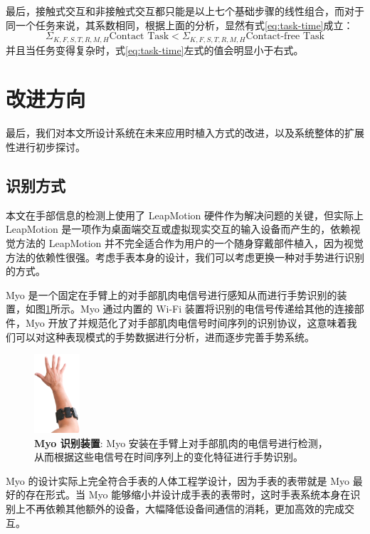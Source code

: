 最后，接触式交互和非接触式交互都只能是以上七个基础步骤的线性组合，而对于同一个任务来说，其系数相同，根据上面的分析，显然有式\ref{eq:task-time}成立：
\begin{equation}
    \label{eq:task-time}
    \Sigma_{K,F,S,T,R,M,H}{\text{Contact Task}} < \Sigma_{K,F,S,T,R,M,H}{\text{Contact-free Task}}
\end{equation}
并且当任务变得复杂时，式\ref{eq:task-time}左式的值会明显小于右式。

\section{改进方向}

最后，我们对本文所设计系统在未来应用时植入方式的改进，以及系统整体的扩展性进行初步探讨。

\subsection{识别方式}

本文在手部信息的检测上使用了 LeapMotion 硬件作为解决问题的关键，但实际上 LeapMotion 是一项作为桌面端交互或虚拟现实交互的输入设备而产生的，依赖视觉方法的 LeapMotion 并不完全适合作为用户的一个随身穿戴部件植入，因为视觉方法的依赖性很强。考虑手表本身的设计，我们可以考虑更换一种对手势进行识别的方式。

Myo \cite{Myo:2016} 是一个固定在手臂上的对手部肌肉电信号进行感知从而进行手势识别的装置，如图\ref{fig:myo}所示。Myo 通过内置的 Wi-Fi 装置将识别的电信号传递给其他的连接部件，Myo 开放了并规范化了对手部肌肉电信号时间序列的识别协议，这意味着我们可以对这种表现模式的手势数据进行分析，进而逐步完善手势系统。

\begin{figure}[H]
    \centering
    \includegraphics[width=0.15\textwidth]{figures/myo}
    \caption{\kaishu \textbf{Myo 识别装置}: Myo 安装在手臂上对手部肌肉的电信号进行检测，从而根据这些电信号在时间序列上的变化特征进行手势识别。}
    \label{fig:myo}
\end{figure}

Myo 的设计实际上完全符合手表的人体工程学设计，因为手表的表带就是 Myo 最好的存在形式。当 Myo 能够缩小并设计成手表的表带时，这时手表系统本身在识别上不再依赖其他额外的设备，大幅降低设备间通信的消耗，更加高效的完成交互。

